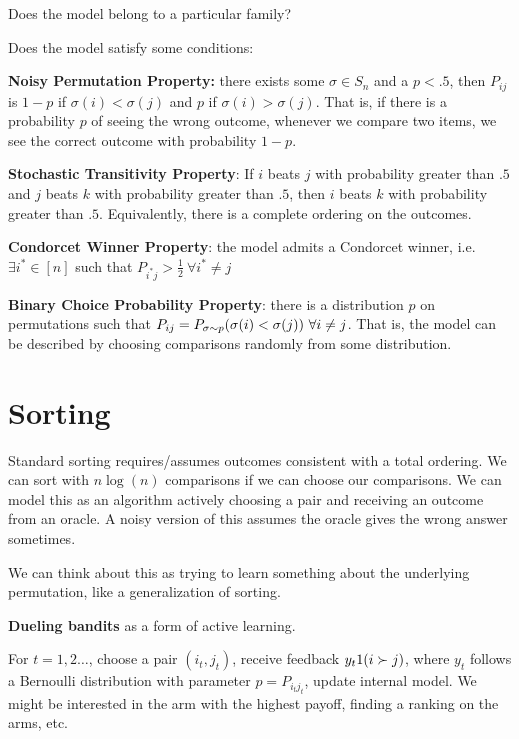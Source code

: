 \documentclass[twoside]{article}
\begin{document}
Does the model belong to a particular family?

Does the model satisfy some conditions:

\textbf{Noisy Permutation Property:} there exists some $\sigma\in S_n$ and a $p<.5$, then $P_{ij}$ is $1-p$ if $\sigma(i) < \sigma(j)$ and $p$ if $\sigma(i) > \sigma(j)$.  That is, if there is a probability $p$ of seeing the wrong outcome, whenever we compare two items, we see the correct outcome with probability $1-p$.

\textbf{Stochastic Transitivity Property}: If $i$ beats $j$ with probability greater than $.5$ and $j$ beats $k$ with probability greater than $.5$, then $i$ beats $k$ with probability greater than $.5$.  Equivalently, there is a complete ordering on the outcomes.

\textbf{Condorcet Winner Property}: the model admits a Condorcet winner, i.e. $\exists i^* \in [n]$ such that $P_{i^*j} > \frac{1}{2} \  \forall i^* \neq j$ 

\textbf{Binary Choice Probability Property}: there is a distribution $p$ on permutations such that $P_{ij} = \boldmath{P}_{\sigma \sim p} (\sigma(i) < \sigma(j)) \ \forall i\neq j$.  That is, the model can be described by choosing comparisons randomly from some distribution.


\section*{Sorting}

Standard sorting requires/assumes outcomes consistent with a total ordering.  We can sort with $n\log(n)$ comparisons if we can choose our comparisons.  We can model this as an algorithm actively choosing a pair and receiving an outcome from an oracle.  A noisy version of this assumes the oracle gives the wrong answer sometimes.

We can think about this as trying to learn something about the underlying permutation, like a generalization of sorting.

\textbf{Dueling bandits} as a form of active learning.  

For $t=1,2\dots$, choose a pair $(i_t,j_t)$, receive feedback $y_t\boldmath{1}(i\succ j)$, where $y_t$ follows a Bernoulli distribution with parameter $p=P_{i_tj_t}$, update internal model.  We might be interested in the arm with the highest payoff, finding a ranking on the arms, etc.
\end{document}
